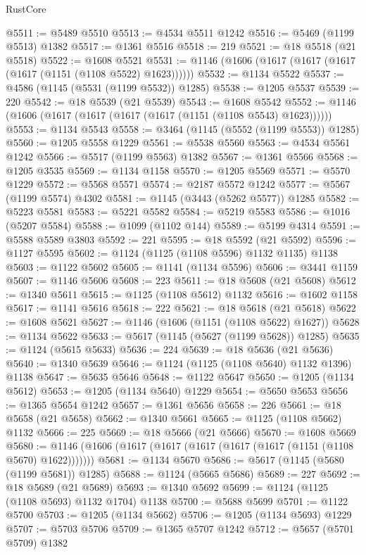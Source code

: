 \begin{lexlean}{RustCore}
\begin{coremodule}
@5511 := @5489 @5510
@5513 := @4534 @5511 @1242
@5516 := @5469 (@1199 @5513) @1382
@5517 := @1361 @5516
@5518 := 219
@5521 := @18 @5518 (@21 @5518)
@5522 := @1608 @5521
@5531 := @1146 (@1606 (@1617 (@1617 (@1617 (@1617 (@1151 (@1108 @5522) @1623))))))
@5532 := @1134 @5522
@5537 := @4586 (@1145 (@5531 (@1199 @5532)) @1285)
@5538 := @1205 @5537
@5539 := 220
@5542 := @18 @5539 (@21 @5539)
@5543 := @1608 @5542
@5552 := @1146 (@1606 (@1617 (@1617 (@1617 (@1617 (@1151 (@1108 @5543) @1623))))))
@5553 := @1134 @5543
@5558 := @3464 (@1145 (@5552 (@1199 @5553)) @1285)
@5560 := @1205 @5558 @1229
@5561 := @5538 @5560
@5563 := @4534 @5561 @1242
@5566 := @5517 (@1199 @5563) @1382
@5567 := @1361 @5566
@5568 := @1205 @3535
@5569 := @1134 @1158
@5570 := @1205 @5569
@5571 := @5570 @1229
@5572 := @5568 @5571
@5574 := @2187 @5572 @1242
@5577 := @5567 (@1199 @5574) @4302
@5581 := @1145 (@3443 (@5262 @5577)) @1285
@5582 := @5223 @5581
@5583 := @5221 @5582
@5584 := @5219 @5583
@5586 := @1016 (@5207 @5584)
@5588 := @1099 (@1102 @144)
@5589 := @5199 @4314
@5591 := @5588 @5589 @3803
@5592 := 221
@5595 := @18 @5592 (@21 @5592)
@5596 := @1127 @5595
@5602 := @1124 (@1125 (@1108 @5596) @1132 @1135) @1138
@5603 := @1122 @5602
@5605 := @1141 (@1134 @5596)
@5606 := @3441 @1159
@5607 := @1146 @5606
@5608 := 223
@5611 := @18 @5608 (@21 @5608)
@5612 := @1340 @5611
@5615 := @1125 (@1108 @5612) @1132
@5616 := @1602 @1158
@5617 := @1141 @5616
@5618 := 222
@5621 := @18 @5618 (@21 @5618)
@5622 := @1608 @5621
@5627 := @1146 (@1606 (@1151 (@1108 @5622) @1627))
@5628 := @1134 @5622
@5633 := @5617 (@1145 (@5627 (@1199 @5628)) @1285)
@5635 := @1124 (@5615 @5633)
@5636 := 224
@5639 := @18 @5636 (@21 @5636)
@5640 := @1340 @5639
@5646 := @1124 (@1125 (@1108 @5640) @1132 @1396) @1138
@5647 := @5635 @5646
@5648 := @1122 @5647
@5650 := @1205 (@1134 @5612)
@5653 := @1205 (@1134 @5640) @1229
@5654 := @5650 @5653
@5656 := @1365 @5654 @1242
@5657 := @1361 @5656
@5658 := 226
@5661 := @18 @5658 (@21 @5658)
@5662 := @1340 @5661
@5665 := @1125 (@1108 @5662) @1132
@5666 := 225
@5669 := @18 @5666 (@21 @5666)
@5670 := @1608 @5669
@5680 := @1146 (@1606 (@1617 (@1617 (@1617 (@1617 (@1617 (@1151 (@1108 @5670) @1622)))))))
@5681 := @1134 @5670
@5686 := @5617 (@1145 (@5680 (@1199 @5681)) @1285)
@5688 := @1124 (@5665 @5686)
@5689 := 227
@5692 := @18 @5689 (@21 @5689)
@5693 := @1340 @5692
@5699 := @1124 (@1125 (@1108 @5693) @1132 @1704) @1138
@5700 := @5688 @5699
@5701 := @1122 @5700
@5703 := @1205 (@1134 @5662)
@5706 := @1205 (@1134 @5693) @1229
@5707 := @5703 @5706
@5709 := @1365 @5707 @1242
@5712 := @5657 (@5701 @5709) @1382

\end{coremodule}
\end{lexlean}
